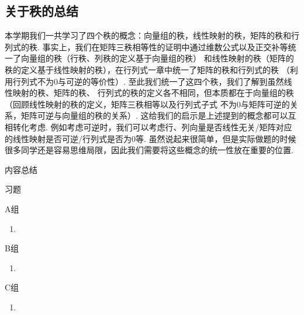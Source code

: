 \subsection{关于秩的总结}
本学期我们一共学习了四个秩的概念：向量组的秩，线性映射的秩，矩阵的秩和行列式的秩.
事实上，我们在矩阵三秩相等性的证明中通过维数公式以及正交补等统一了向量组的秩（行秩、列秩的定义基于向量组的秩）
和线性映射的秩（矩阵的秩的定义基于线性映射的秩），在行列式一章中统一了矩阵的秩和行列式的秩
（利用行列式不为0与可逆的等价性）. 至此我们统一了这四个秩，我们了解到虽然线性映射的秩、矩阵的秩、
行列式的秩的定义各不相同，但本质都在于向量组的秩（回顾线性映射的秩的定义，矩阵三秩相等以及行列式子式
不为0与矩阵可逆的关系，矩阵可逆与向量组的秩的关系）. 这给我们的启示是上述提到的概念都可以互相转化考虑.
例如考虑可逆时，我们可以考虑行、列向量是否线性无关/矩阵对应的线性映射是否可逆/行列式是否为0等.
虽然说起来很简单，但是实际做题的时候很多同学还是容易思维局限，因此我们需要将这些概念的统一性放在重要的位置.

\vspace{2ex}
\centerline{\heiti \Large 内容总结}

\vspace{2ex}

\centerline{\heiti \Large 习题}
\vspace{2ex}
{\kaishu }
\begin{flushright}
    \kaishu

\end{flushright}
\centerline{\heiti A组}
\begin{enumerate}
    \item
\end{enumerate}
\centerline{\heiti B组}
\begin{enumerate}
    \item
\end{enumerate}
\centerline{\heiti C组}
\begin{enumerate}
    \item
\end{enumerate}
